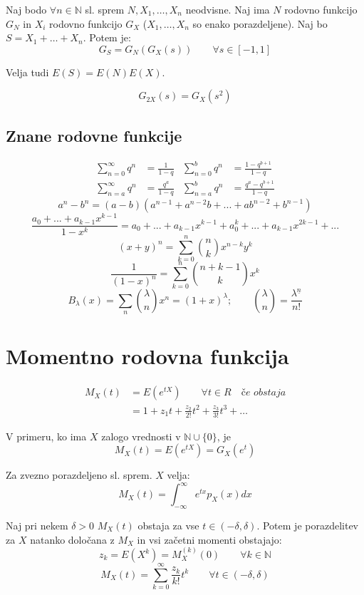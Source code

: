 \begin{multicols}{5}
Naj bodo $\forall n \in \mathbb{N}$ sl. sprem $N, X_1, \dots, X_n$ neodvisne. Naj ima $N$ rodovno funkcijo $G_N$ in $X_i$ rodovno funkcijo $G_X$ ($X_1, \dots, X_n$ so enako porazdeljene).
Naj bo $S = X_1 +  \dots + X_n$. Potem je:
\[ G_S = G_N(G_X(s)) \qquad \forall s \in [-1, 1]\]

Velja tudi $E(S) = E(N)E(X)$.

\[ G_{2X}(s) = G_X(s^2)\]

\subsection{Znane rodovne funkcije}
\[
    \begin{aligned}
        \sum_{n=0}^{\infty} q^n &= \frac{1}{1-q} &
        \sum_{n=0}^{b} q^n &= \frac{1-q^{b+1}}{1-q}
        \\
        \sum_{n=a}^{\infty} q^n &= \frac{q^{a}}{1-q} &
        \sum_{n=a}^{b} q^n &= \frac{q^a-q^{b+1}}{1-q}
    \end{aligned}
\]
\[
    a^n - b^n = (a-b)(a^{n-1} + a^{n-2}b + ... + ab^{n-2} + b^{n-1})  
\]
\[ \textstyle \frac{a_0 + ... + a_{k-1}x^{k-1}}{1-x^k} = a_0 + ... + a_{k-1}x^{k-1} + a_0^k + ... + a_{k-1}x^{2k-1} + ...\]
\[ (x+y)^n = \sum_{k=0}^{n} \binom{n}{k} x^{n-k}y^{k} \]
\[ \frac{1}{(1-x)^n} = \sum_{k=0}^{n} \binom{n+k-1}{k} x^{k} \]
\[ B_\lambda(x) = \sum_{n} \binom{\lambda}{n} x^{n} = (1+x)^\lambda; \qquad \binom{\lambda}{n} = \frac{\lambda^{\underline{n}}}{n!}\]


\section{Momentno rodovna funkcija}
\begin{align*}
    M_X(t) &= E(e^{tX}) \qquad \forall t \in R \quad \textit{če obstaja} \\
    &= 1 + z_1t + \frac{z_2}{2!} t^2 + \frac{z_3}{3!} t^3 + \dots 
\end{align*} 

V primeru, ko ima $X$ zalogo vrednosti v $\mathbb{N} \cup \{0\}$, je 
\[M_X(t) = E(e^{tX}) = G_X(e^t) \]

Za zvezno porazdeljeno sl. sprem. $X$ velja:
\[ M_X(t) = \int_{-\infty}^\infty e^{tx} p_X(x) dx \]


Naj pri nekem $\delta > 0$ $M_X(t)$ obstaja za vse $t \in (-\delta, \delta)$.
Potem je porazdelitev za $X$ natanko določana z $M_X$ in vsi začetni momenti obstajajo:
\[ z_k = E(X^k) = M_X^{(k)}(0) \qquad \forall k \in \mathbb{N}\]
\[ M_X(t) = \sum_{k=0}^\infty \frac{z_k}{k!}t^k \qquad \forall t \in (-\delta, \delta)\] 


\end{multicols}
